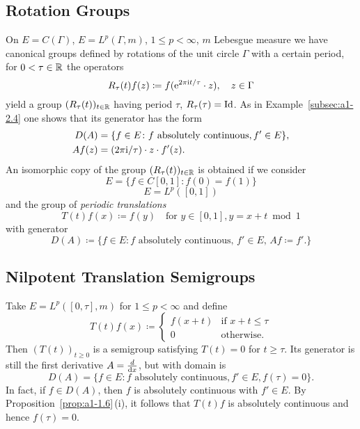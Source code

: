 \subsection{Rotation Groups}\label{subsec:a1-2.5}%
On $E = C(\Gamma)$, \resp $E = L^{p}(\Gamma,m)$, $1 \leq p < \infty$, $m$ Lebesgue measure we have canonical groups defined by rotations of the unit circle $\Gamma$ with a certain period, \ie for $0 < \tau \in \mathbb{R}$ the operators
\[
    R_{\tau}(t)f(z) \coloneqq f( \mathrm{e}^{2\pi \mathrm{i} t/\tau}\cdot z), \quad z \in \Gamma
\]
yield a group $(R_{\tau}(t))_{t \in \mathbb{R}}$ having period $\tau$, \ie $R_{\tau}(\tau) = \operatorname{Id}$.
As in Example~\ref{subsec:a1-2.4} one shows that its generator has the form
\begin{align*}
    D(A) &= \{f \in E \colon f \text{ absolutely continuous}, f' \in E\}, \\
    Af(z)&= (2\pi \mathrm{i}/\tau) \cdot z \cdot f'(z).
\end{align*}
An isomorphic copy of the group $(R_{\tau}(t))_{t \in \mathbb{R}}$ is obtained if we consider 
\[
E = \{f \in C\left[ 0,1 \right] \colon f(0) = f(1)\}
\]
\resp 
\[
E = L^{p}(\left[ 0,1 \right])
\]
and the group of \emph{periodic translations}
\[
    T(t)f(x) \coloneqq f(y) \quad \text{for $y \in \left[ 0,1 \right], y = x+t \bmod 1$} 
\]
with generator
\[
    D(A) \coloneqq \{f \in E \colon f \text{ absolutely continuous, $f' \in E$, $Af \coloneqq f'$.}\}
\]
\subsection{Nilpotent Translation Semigroups}\label{subsec:a1-2.6}%
Take $E = L^{p}([0,\tau],m)$ for $1 \leq p < \infty$ and define
\[
    T(t)f(x) \coloneqq \begin{cases}
        f(x+t) & \text{if } x+t \leq \tau \\
        0 & \text{otherwise.}
    \end{cases}
\]
Then $(T(t))_{t\geq 0}$ is a semigroup satisfying $T(t) = 0$ for $t \geq \tau$.
Its generator is still the first derivative $A = \frac{d}{\mathop{}\!\mathrm{d}{x}}$, but with domain is 
\[
D(A) = \{f \in E \colon f \text{ absolutely continuous}, f' \in E, f(\tau) = 0\}.
\]
In fact, if $f \in D(A)$, then $f$ is absolutely continuous with $f' \in E$.
By Proposition~\ref{prop:a1-1.6}\,(i), it follows that $T(t)f$ is absolutely continuous and hence $f(\tau) = 0$.
